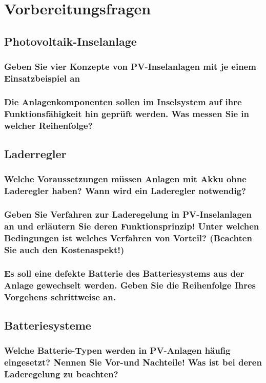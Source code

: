 \section{Vorbereitungsfragen}
\subsection{Photovoltaik-Inselanlage}
\subsubsection{Geben Sie vier Konzepte von PV-Inselanlagen mit je einem Einsatzbeispiel an}
\blindtext
\subsubsection{Die Anlagenkomponenten sollen im Inselsystem auf ihre Funktionsfähigkeit hin geprüft werden. Was messen Sie in welcher Reihenfolge?}
\blindtext

\subsection{Laderregler}
\subsubsection{Welche Voraussetzungen müssen Anlagen mit Akku ohne Laderegler haben? Wann wird ein Laderegler notwendig?}
\blindtext
\subsubsection{Geben Sie Verfahren zur Laderegelung in PV-Inselanlagen an und erläutern Sie deren Funktionsprinzip! Unter welchen Bedingungen ist welches Verfahren von Vorteil? (Beachten Sie auch den Kostenaspekt!)}
\blindtext
\subsubsection{Es soll eine defekte Batterie des Batteriesystems aus der Anlage gewechselt werden. Geben Sie die Reihenfolge Ihres Vorgehens schrittweise an.}
\blindtext

\subsection{Batteriesysteme}
\subsubsection{Welche Batterie-Typen werden in PV-Anlagen häufig eingesetzt? Nennen Sie Vor-und Nachteile! Was ist bei deren Laderegelung zu beachten?}
\blindtext
